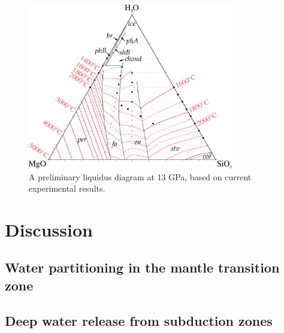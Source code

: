 \documentclass[review]{elsarticle}
\begin{document}
\begin{figure}[ht!]
  \centering
      \includegraphics[width=0.8\textwidth]{figures/experimental-ternary}
  \caption{A preliminary liquidus diagram at 13 GPa, based on current experimental results.}
  \label{fig:liquidus}
\end{figure}


\section{Discussion}
\subsection{Water partitioning in the mantle transition zone}

\cite{DDFK2005}
\citep{LSOK2011}
\citep{OMY2000}

\subsection{Deep water release from subduction zones}
\cite{MF2010}
\cite{BK2003}
\cite{MSK2008}


\end{document}
